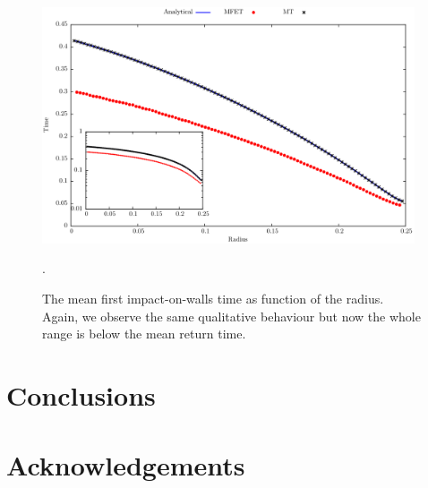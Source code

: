 \documentclass[a4paper,10pt, jcp, aps, preprint]{revtex4-1}
\begin{document}
\begin{figure}[h]
  \centering
  \includegraphics[width=0.98\textwidth]{./FigurasPerfectas/FistImpactTime01-ForPaper.pdf}
  \caption{The mean first impact-on-walls time as function of the radius. Again, 
    we observe the same qualitative behaviour but now the whole range is below
    the mean return time.}\label{FirstImp01}.
\end{figure}


\section{Conclusions}



\section{Acknowledgements}



\end{document}
